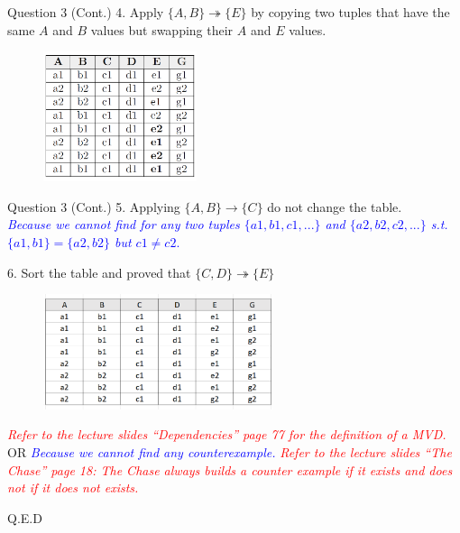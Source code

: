 \begin{frame}[fragile]{Question 3 (Cont.)}
4. Apply $\{A,B\} \twoheadrightarrow \{E\}$ by copying two tuples that have the same $A$ and $B$ values but swapping their $A$ and $E$ values.\\
\begin{figure}
	\includegraphics[width=0.4\textwidth, trim=0 0 0 0, clip]{4221-t5/images/3-4.png}
\end{figure}
\end{frame}


\begin{frame}[fragile]{Question 3 (Cont.)}
5. Applying $\{A,B\} \rightarrow \{C\}$ do not change the table.\\\vspace{5pt}
\textcolor{blue}{{\small \textit{Because we cannot find for any two tuples $\{a1,b1,c1,...\}$ and $\{a2,b2,c2,...\}$ s.t. $\{a1,b1\}=\{a2,b2\}$ but $c1 \ne c2$}.}}\\\vspace{5pt}

6. Sort the table and proved that $\{C,D\}\twoheadrightarrow\{E\}$ 
	\begin{figure}
		\includegraphics[width=0.6\textwidth, trim=0 0 0 0, clip]{4221-t5/images/3-6a.png}
	\end{figure}

\textcolor{red}{{\small \textit{Refer to the lecture slides ``Dependencies'' page 77 for the definition of a MVD.}}}\\\vspace{5pt}
OR \textcolor{blue}{{\small \textit{Because we cannot find any counterexample.}}}
\textcolor{red}{{\small \textit{Refer to the lecture slides ``The Chase'' page 18: The Chase always builds a counter example if it exists and does not if it does not exists.}}}\\\vspace{10pt}


	\hfill Q.E.D
\end{frame}


